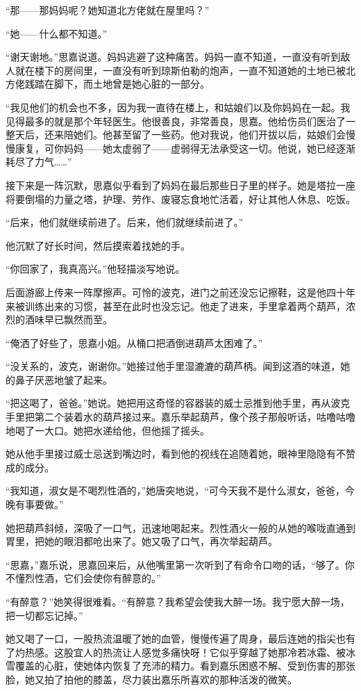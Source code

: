 \par “那——那妈妈呢？她知道北方佬就在屋里吗？”
\par “她——什么都不知道。”
\par “谢天谢地。”思嘉说道。妈妈逃避了这种痛苦。妈妈一直不知道，一直没有听到敌人就在楼下的房间里，一直没有听到琼斯伯勒的炮声，一直不知道她的土地已被北方佬践踏在脚下，而土地曾是她心脏的一部分。
\par “我见他们的机会也不多，因为我一直待在楼上，和姑娘们以及你妈妈在一起。我见得最多的就是那个年轻医生。他很善良，非常善良，思嘉。他给伤员们医治了一整天后，还来陪她们。他甚至留了一些药。他对我说，他们开拔以后，姑娘们会慢慢康复，可你妈妈——她太虚弱了——虚弱得无法承受这一切。他说，她已经逐渐耗尽了力气……”
\par 接下来是一阵沉默，思嘉似乎看到了妈妈在最后那些日子里的样子。她是塔拉一座将要倒塌的力量之塔，护理、劳作、废寝忘食地忙活着，好让其他人休息、吃饭。
\par “后来，他们就继续前进了。后来，他们就继续前进了。”
\par 他沉默了好长时间，然后摸索着找她的手。
\par “你回家了，我真高兴。”他轻描淡写地说。
\par 后面游廊上传来一阵摩擦声。可怜的波克，进门之前还没忘记擦鞋，这是他四十年来被训练出来的习惯，甚至在此时也没忘记。他走了进来，手里拿着两个葫芦，浓烈的酒味早已飘然而至。
\par “俺洒了好些了，思嘉小姐。从桶口把酒倒进葫芦太困难了。”
\par “没关系的，波克，谢谢你。”她接过他手里湿漉漉的葫芦柄。闻到这酒的味道，她的鼻子厌恶地皱了起来。
\par “把这喝了，爸爸。”她说。她把用这奇怪的容器装的威士忌推到他手里，再从波克手里把第二个装着水的葫芦接过来。嘉乐举起葫芦，像个孩子那般听话，咕噜咕噜地喝了一大口。她把水递给他，但他摇了摇头。
\par 她从他手里接过威士忌送到嘴边时，看到他的视线在追随着她，眼神里隐隐有不赞成的成分。
\par “我知道，淑女是不喝烈性酒的，”她唐突地说，“可今天我不是什么淑女，爸爸，今晚有事要做。”
\par 她把葫芦斜倾，深吸了一口气，迅速地喝起来。烈性酒火一般的从她的喉咙直通到胃里，把她的眼泪都呛出来了。她又吸了口气，再次举起葫芦。
\par “思嘉，”嘉乐说，思嘉回来后，从他嘴里第一次听到了有命令口吻的话，“够了。你不懂烈性酒，它们会使你有醉意的。”
\par “有醉意？”她笑得很难看。“有醉意？我希望会使我大醉一场。我宁愿大醉一场，把一切都忘记掉。”
\par 她又喝了一口，一股热流温暖了她的血管，慢慢传遍了周身，最后连她的指尖也有了灼热感。这股宜人的热流让人感觉多痛快呀！它似乎穿越了她那冷若冰霜、被冰雪覆盖的心脏，使她体内恢复了充沛的精力。看到嘉乐困惑不解、受到伤害的那张脸，她又拍了拍他的膝盖，尽力装出嘉乐所喜欢的那种活泼的微笑。
